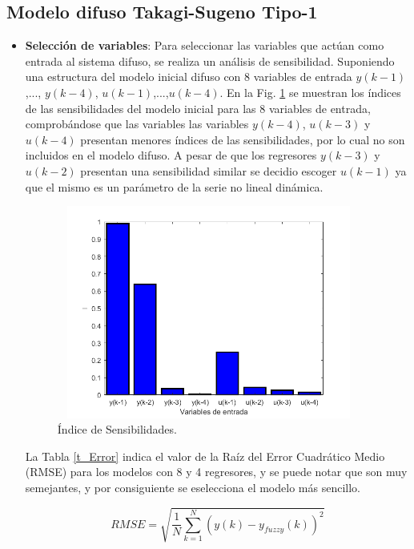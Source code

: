 \documentclass[12pt]{article}
\begin{document}
\newpage

\subsection{Modelo difuso Takagi-Sugeno Tipo-1}

\begin{itemize}
	\item \textbf{Selección de variables}:
Para seleccionar las variables que actúan como entrada al sistema difuso, se realiza un análisis de sensibilidad. Suponiendo una estructura del modelo inicial difuso con 8 variables de entrada $y(k-1)$,..., $y(k-4)$, $u(k-1)$,...,$u(k-4)$. En la Fig. \ref{f_P1Sensibilidad} se muestran los índices de las sensibilidades del modelo inicial para las 8
variables de entrada, comprobándose que las variables las variables $y(k-4)$, $u(k-3)$ y $u(k-4)$ presentan menores índices de las sensibilidades, por lo cual no son incluidos en el modelo difuso. A pesar de que los regresores $y(k-3)$ y $u(k-2)$ presentan una sensibilidad similar se decidio escoger $u(k-1)$ ya que el mismo es un parámetro de la serie no lineal dinámica.

\begin{figure}
\centering
\includegraphics[width=10cm,height=7cm]{imag/P1Sensibilidad}
\caption{Índice de Sensibilidades.}
\label{f_P1Sensibilidad}
\end{figure}

La Tabla \ref{t_Error} indica el valor de la Raíz del Error Cuadrático Medio (RMSE) para los modelos con 8 y 4 regresores, y se puede notar que son muy semejantes, y por consiguiente se eselecciona el modelo más sencillo.

\begin{equation}
RMSE=\sqrt{\frac{1}{N}\sum_{k=1}^{N}(y(k)-y_{fuzzy}(k))^2}
\label{e_RMSE}
\end{equation}



\end{itemize}
\end{document}
